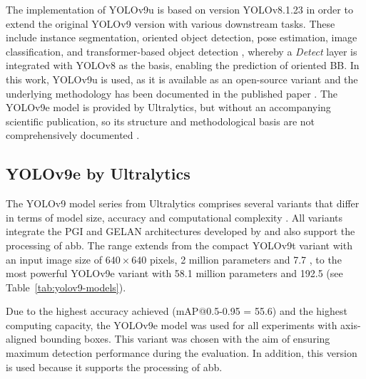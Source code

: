 The implementation of \acrshort{YOLO}v9u is based on version \acrshort{YOLO}v8.1.23 \cite{yolo_v9u_github} in order to extend the original \acrshort{YOLO}v9 version with various downstream tasks. These include instance segmentation, oriented object detection, pose estimation, image classification, and transformer-based object detection \cite{wang2024}, whereby a \textit{Detect} layer is integrated with \acrshort{YOLO}v8 as the basis, enabling the prediction of oriented \acrshort{BB}. In this work, \acrshort{YOLO}v9u is used, as it is available as an open-source variant and the underlying methodology has been documented in the published paper \cite{wang2024_sapkota}. The \acrshort{YOLO}v9e model is provided by Ultralytics, but without an accompanying scientific publication, so its structure and methodological basis are not comprehensively documented \cite{ultralyics_2023}.
 



\subsection{YOLOv9e by Ultralytics}
\label{subsec:yolov9e}

The \acrshort{YOLO}v9 model series from Ultralytics comprises several variants that differ in terms of model size, accuracy and computational complexity \cite{ultralyics_yolov9}. All variants integrate the \acrshort{PGI} and \acrshort{GELAN} architectures developed by \citeauthor{wang2024_sapkota} \cite{wang2024_sapkota} and also support the processing of \acrshort{abb}. The range extends from the compact \acrshort{YOLO}v9t variant with an input image size of $640 \times 640$ pixels, 2 million parameters and 7.7 , to the most powerful \acrshort{YOLO}v9e variant with 58.1 million parameters and 192.5  (see Table~\ref{tab:yolov9-models}).

Due to the highest accuracy achieved (\acrshort{mAP}@0.5-0.95 = 55.6) and the highest computing capacity, the \acrshort{YOLO}v9e model was used for all experiments with axis-aligned bounding boxes. This variant was chosen with the aim of ensuring maximum detection performance during the evaluation. In addition, this version is used because it supports the processing of \acrlong{abb}.




